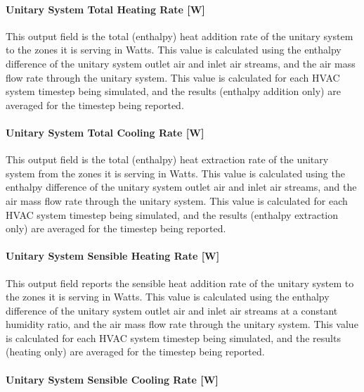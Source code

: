 \paragraph{Unitary System Total Heating Rate {[}W{]}}\label{unitary-system-total-heating-rate-w}

This output field is the total (enthalpy) heat addition rate of the unitary system to the zones it is serving in Watts. This value is calculated using the enthalpy difference of the unitary system outlet air and inlet air streams, and the air mass flow rate through the unitary system. This value is calculated for each HVAC system timestep being simulated, and the results (enthalpy addition only) are averaged for the timestep being reported.

\paragraph{Unitary System Total Cooling Rate {[}W{]}}\label{unitary-system-total-cooling-rate-w}

This output field is the total (enthalpy) heat extraction rate of the unitary system from the zones it is serving in Watts. This value is calculated using the enthalpy difference of the unitary system outlet air and inlet air streams, and the air mass flow rate through the unitary system. This value is calculated for each HVAC system timestep being simulated, and the results (enthalpy extraction only) are averaged for the timestep being reported.

\paragraph{Unitary System Sensible Heating Rate {[}W{]}}\label{unitary-system-sensible-heating-rate-w}

This output field reports the sensible heat addition rate of the unitary system to the zones it is serving in Watts. This value is calculated using the enthalpy difference of the unitary system outlet air and inlet air streams at a constant humidity ratio, and the air mass flow rate through the unitary system. This value is calculated for each HVAC system timestep being simulated, and the results (heating only) are averaged for the timestep being reported.

\paragraph{Unitary System Sensible Cooling Rate {[}W{]}}\label{unitary-system-sensible-cooling-rate-w}

